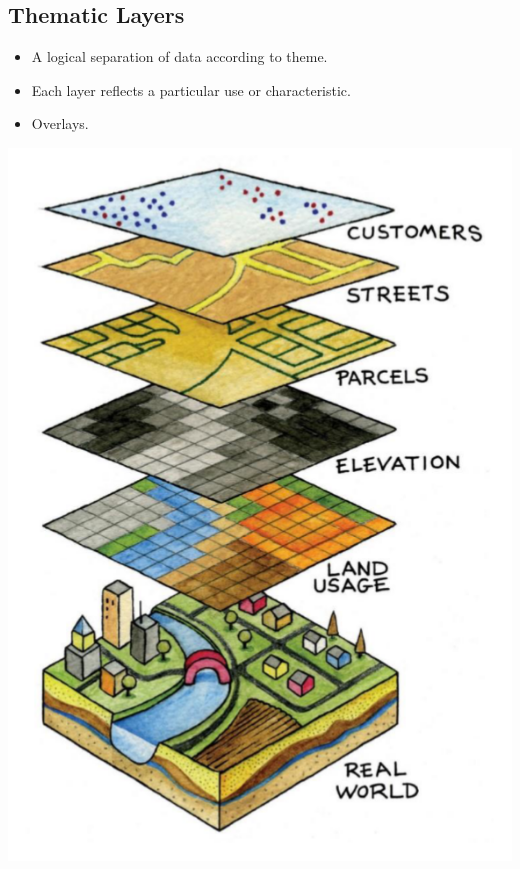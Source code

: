 \documentclass[11pt]{article}
\theoremstyle{definition}
\begin{document}

\subsection{Thematic Layers}
\begin{itemize}
    \item A logical separation of data according to theme.
    \item Each layer reflects a particular use or characteristic.
    \item Overlays.
\end{itemize}

\includegraphics[width=\textwidth/4]{6.png}
\end{document}
